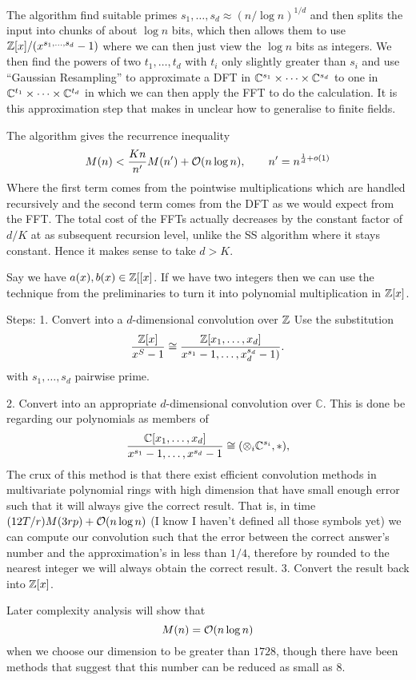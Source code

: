 The algorithm find suitable primes $s_1, \ldots, s_d \approx (n / \log n)^{1/d}$ and then splits the input into chunks of about $\log n$ bits, which then allows them to use ${\mathbb Z}[x]/ (x^{s_1, \ldots, s_d} - 1)$ where we can then just view the $\log n$ bits as integers. We then find the powers of two $t_1, \ldots, t_d$ with $t_i$ only slightly greater than $s_i$ and use ``Gaussian Resampling'' to approximate a DFT in ${\mathbb C}^{s_1} \times \cdots \times {\mathbb C}^{s_d}$ to one in ${\mathbb C}^{t_1} \times \cdots \times {\mathbb C}^{t_d}$ in which we can then apply the FFT to do the calculation. It is this approximation step that makes in unclear how to generalise to finite fields.

The algorithm gives the recurrence inequality
\[
    M(n) < \frac{Kn}{n^\prime}M(n^\prime) + \mathcal O(n \log n), \qquad n^\prime = n^{\frac{1}{d} + o(1)}
\]
Where the first term comes from the pointwise multiplications which are handled recursively and the second term comes from the DFT as we would expect from the FFT. The total cost of the FFTs actually decreases by the constant factor of $d/K$ at as subsequent recursion level, unlike the SS algorithm where it stays constant. Hence it makes sense to take $d > K$.

Say we have $a(x) , b(x) \in {\mathbb Z}[[x]$. If we have two integers then we can use the technique from the preliminaries to turn it into polynomial multiplication in ${\mathbb Z}[x]$.

Steps:
1. Convert into a $d$-dimensional convolution over ${\mathbb Z}$
Use the substitution
\[
  \frac{{\mathbb Z}[x]}{x^S - 1} \cong \frac{{\mathbb Z}[x_1, \ldots, x_d]}{x^{s_1} - 1, \ldots, x_d^{s_d} - 1)}.
\]
with $s_1, \ldots, s_d$ pairwise prime.

2. Convert into an appropriate $d$-dimensional convolution over $\mathbb{C}$.
This is done be regarding our polynomials as members of
\[
  \frac{{\mathbb C}[x_1, \ldots, x_d]}{x^{s_1} - 1, \ldots, x^{s_d} - 1} \cong (\otimes_i {\mathbb C}^{s_i}, \ast),
\]
The crux of this method is that there exist efficient convolution methods in multivariate polynomial rings with high dimension that have small enough error such that it will always give the correct result. That is, in time $(12T/r)M(3rp) + \mathcal O(n\log n)$ (I know I haven't defined all those symbols yet) we can compute our convolution such that the error between the correct answer's number and the approximation's in less than $1 / 4$, therefore by rounded to the nearest integer we will always obtain the correct result.
3. Convert the result back into ${\mathbb Z}[x]$.

Later complexity analysis will show that
\[
  M(n) = \mathcal O(n \log n)
\]
when we choose our dimension to be greater than $1728$, though there have been methods that suggest that this number can be reduced as small as $8$.


